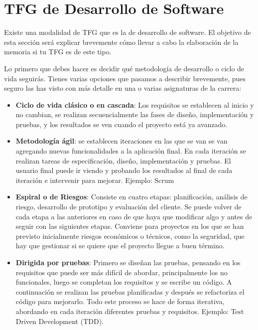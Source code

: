 \section{TFG de Desarrollo de Software}
\label{appendix:desarrollo}

Existe una modalidad de TFG que es la de desarrollo de software. El objetivo de esta sección será explicar brevemente cómo llevar a cabo la elaboración de la memoria si tu TFG es de este tipo.

Lo primero que debes hacer es decidir qué metodología de desarrollo o ciclo de vida seguirás. Tienes varias opciones que pasamos a describir brevemente, pues seguro las has visto con más detalle en una o varias asignaturas de la carrera: 
\begin{itemize}
    \item \textbf{Ciclo de vida clásico o en cascada}: Los requisitos se establecen al inicio y no cambian, se realizan secuencialmente las fases de diseño, implementación y pruebas, y los resultados se ven cuando el proyecto está ya avanzado. 
     \item \textbf{Metodología ágil}: se establecen iteraciones en las que se van se van agregando nuevas funcionalidades a la aplicación final. En cada iteración se realizan tareas de especificación, diseño, implementación y pruebas. El usuario final puede ir viendo y probando los resultados al final de cada iteración e intervenir para mejorar. Ejemplo: Scrum
     \item \textbf{Espiral o de Riesgos}: Consiste en cuatro etapas: planificación, análisis de riesgo, desarrollo de prototipo y evaluación del cliente. Se puede volver de cada etapa a las anteriores en caso de que haya que modificar algo y antes de seguir con las siguientes etapas. Conviene para proyectos en los que se han previsto inicialmente riesgos económicos o técnicos, como la seguridad, que hay que gestionar si se quiere que el proyecto llegue a buen término.
     \item \textbf{Dirigida por pruebas}: Primero se diseñan las pruebas, pensando en los requisitos que puede ser más difícil de abordar, principalmente los no funcionales, luego se completan los requisitos y se escribe un código. A continuación se realizan las pruebas planificadas y después se refactoriza el código para mejorarlo. Todo este proceso se hace de forma iterativa, abordando en cada iteración diferentes pruebas y requisitos. Ejemplo: Test Driven Development (TDD).

\end{itemize}

